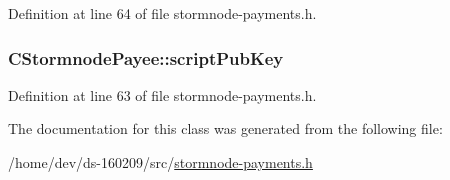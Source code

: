 Definition at line 64 of file stormnode-\/payments.\+h.

\hypertarget{class_c_stormnode_payee_acab0a3c2609700241d04323f1727c870}{}
\subsubsection[{script\+Pub\+Key}]{ C\+Stormnode\+Payee\+::script\+Pub\+Key}\label{class_c_stormnode_payee_acab0a3c2609700241d04323f1727c870}


Definition at line 63 of file stormnode-\/payments.\+h.



The documentation for this class was generated from the following file\+:\begin{DoxyCompactItemize}
\item 
/home/dev/ds-\/160209/src/\hyperlink{stormnode-payments_8h}{stormnode-\/payments.\+h}\end{DoxyCompactItemize}
